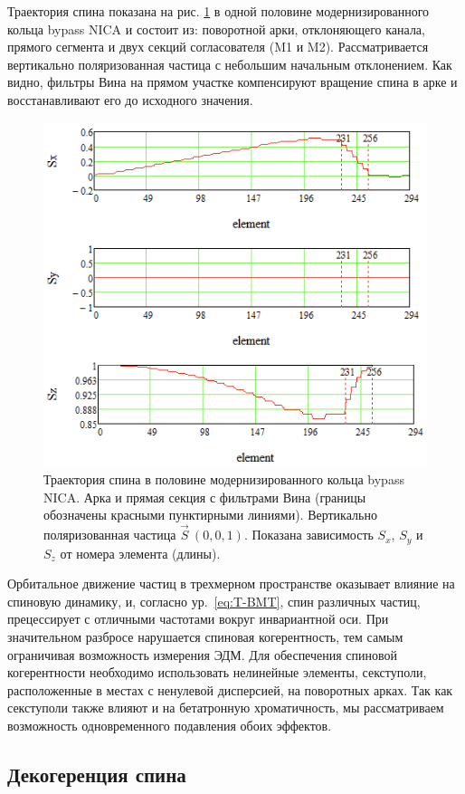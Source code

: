 \par Траектория спина показана на рис. \ref{fig:4bypassspin} в одной половине модернизированного кольца bypass NICA и состоит из: поворотной арки, отклоняющего канала, прямого сегмента и двух секций согласователя (M1 и M2). Рассматривается вертикально поляризованная частица с небольшим начальным отклонением. Как видно, фильтры Вина на прямом участке компенсируют вращение спина в арке и восстанавливают его до исходного значения.

\begin{figure}[!h]
	\centering
	\includegraphics[width=0.7\linewidth]{images/4_bypass_spin}
	\caption{Траектория спина в половине модернизированного кольца bypass NICA. Арка и прямая секция с фильтрами Вина (границы обозначены красными пунктирными линиями). Вертикально поляризованная частица $\vec{S}~(0,0,1)$. Показана зависимость $S_{x}$, $S_{y}$ и $S_{z}$ от номера элемента (длины).}
	\label{fig:4bypassspin}
\end{figure}

\par Орбитальное движение частиц в трехмерном пространстве оказывает влияние на спиновую динамику, и, согласно ур.~\ref{eq:T-BMT}, спин различных частиц, прецессирует с отличными частотами вокруг инвариантной оси. При значительном разбросе нарушается спиновая когерентность, тем самым ограничивая возможность измерения ЭДМ. Для обеспечения спиновой когерентности необходимо использовать нелинейные элементы, секступоли, расположенные в местах с ненулевой дисперсией, на поворотных арках. Так как секступоли также влияют и на бетатронную хроматичность, мы рассматриваем возможность одновременного подавления обоих эффектов.

		\subsection{Декогеренция спина}\label{sec:EDM/Wien_filter_tracking/decoherence}


